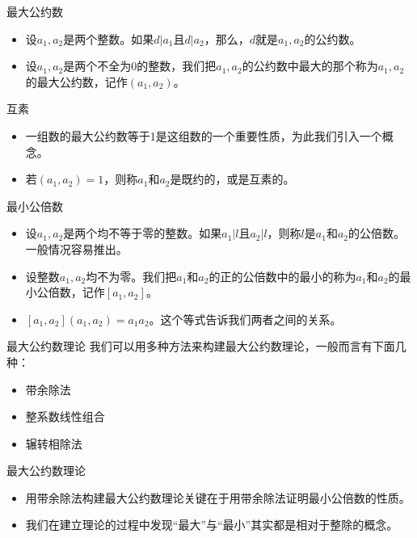 \documentclass[dvipdfmx]{beamer}
\begin{document}
\begin{frame}{最大公约数}
\begin{itemize}
\item 设$a_1, a_2$是两个整数。如果$d|a_1$且$d|a_2$，那么，$d$就是$a_1, a_2$的公约数。
\item 设$a_1, a_2$是两个不全为$0$的整数，我们把$a_1, a_2$的公约数中最大的那个称为$a_1, a_2$的最大公约数，记作$(a_1, a_2)$。
\end{itemize}
\end{frame}

\begin{frame}{互素}
\begin{itemize}
\item 一组数的最大公约数等于1是这组数的一个重要性质，为此我们引入一个概念。
\item 若$(a_1,a_2)=1$，则称$a_1$和$a_2$是既约的，或是互素的。
\end{itemize}
\end{frame}

\begin{frame}{最小公倍数}
\begin{itemize}
\item 设$a_1,a_2$是两个均不等于零的整数。如果$a_1|l$且$a_2|l$，则称$l$是$a_1$和$a_2$的公倍数。一般情况容易推出。
\item 设整数$a_1,a_2$均不为零。我们把$a_1$和$a_2$的正的公倍数中的最小的称为$a_1$和$a_2$的最小公倍数，记作$[a_1, a_2]$。
\item $[a_1,a_2](a_1, a_2)=a_1a_2$。这个等式告诉我们两者之间的关系。
\end{itemize}
\end{frame}

\begin{frame}{最大公约数理论}
我们可以用多种方法来构建最大公约数理论，一般而言有下面几种：
\begin{itemize}
\item 带余除法
\item 整系数线性组合
\item 辗转相除法
\end{itemize}
\end{frame}

\begin{frame}{最大公约数理论}
\begin{itemize}
\item 用带余除法构建最大公约数理论关键在于用带余除法证明最小公倍数的性质。
\item 我们在建立理论的过程中发现“最大”与“最小”其实都是相对于整除的概念。
\end{itemize}
\end{frame}
\end{document}
